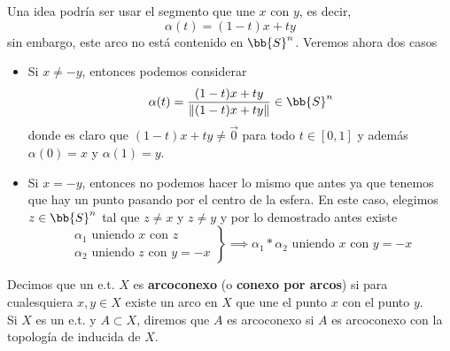 \begin{ejemplo}
\begin{enumerate}
        \noindent
        Una idea podría ser usar el segmento que une $x$ con $y$, es decir, 
        $$\alpha(t) = (1-t)x + ty$$
        sin embargo, este arco no está contenido en $\bb{S}^n$. Veremos ahora dos casos 
        \begin{itemize}
            \item Si $x\neq -y$, entonces podemos considerar
            \begin{equation*}
                \alpha(t) = \frac{(1-t)x + ty}{\|(1-t)x + ty\|} \in \bb{S}^n
            \end{equation*}
            donde es claro que $(1-t)x+ty\neq \vec{0}$ para todo $t\in [0,1]$ y además $\alpha(0)=x$ y $\alpha(1)=y$.\\
            \item Si $x=-y$, entonces no podemos hacer lo mismo que antes ya que tenemos que hay un punto pasando por el centro de la esfera. En este caso, elegimos $z\in \bb{S}^n$ tal que $z\neq x$ y $z\neq y$ y por lo demostrado antes existe
            \begin{equation*}
                \left. \begin{array}{ll}
                    \alpha_1 \text{ uniendo } x \text{ con } z \\
                    \alpha_2 \text{ uniendo } z \text{ con } y=-x
                \end{array}  \right\} 
                \implies \alpha_1\ast\alpha_2 \text{ uniendo } x \text{ con } y=-x
            \end{equation*}
        \end{itemize}

        \noindent
  
    \end{enumerate}
\end{ejemplo}

\begin{definicion}
    Decimos que un e.t. $X$ es \textbf{arcoconexo} (o \textbf{conexo por arcos}) si para cualesquiera $x,y\in X$ existe un arco en $X$ que une el punto $x$ con el punto $y$.\\

    \noindent
    Si $X$ es un e.t. y $A\subset X$, diremos que $A$ es arcoconexo si $A$ es arcoconexo con la topología de inducida de $X$.
\end{definicion}

